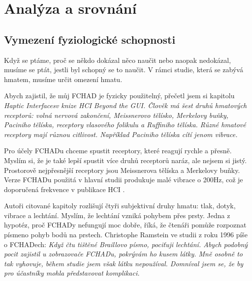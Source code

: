 \chapter{Analýza a srovnání}

\section{Vymezení fyziologické schopnosti}
Když se ptáme, proč se někdo dokázal něco naučit nebo naopak nedokázal, musíme se ptát, jestli byl schopný se to naučit.  V rámci studie, která se zabývá hmatem, musíme určit omezení hmatu.

Abych zajistil, že můj FCHAD je fyzicky použitelný, přečetl jsem si kapitolu \em Haptic Interfaces\em  v knize \em HCI Beyond the GUI\em. Člověk má šest druhů hmatových receptorů: volná nervová zakončení, Meissnerovo tělísko, Merkelovy buňky, Paciniho tělíska, receptory vlasového folikulu a Ruffiniho tělíska. Různé hmatové receptory mají různou citlivost.  Například Paciniho tělíska cítí jenom vibrace.

Pro účely FCHADu chceme spustit receptory, které reagují rychle a přesně.  Myslím si, že je také lepší spustit více druhů receptorů naráz, ale nejsem si jistý.  Prostorově nejpřesnější receptory jsou Meissnerova tělíska a Merkelovy buňky. Verze FCHADu použitá v hlavní studii produkuje malé vibrace o 200Hz, což je doporučená frekvence v publikace HCI \citep[str. 29-30]{nielsen2008gesture}.

Autoři citované kapitoly rozlišují čtyři subjektivní druhy hmatu: tlak, dotyk, vibrace a lechtání.  Myslím, že lechtání vzniká pohybem přes prsty.  Jedna z hypotéz, proč FCHADy nefungují moc dobře, říká, že čtenáři pomůže rozpoznat písmeno pohyb bodů na prstech.  Christophe Ramstein ve studii z roku 1996 píše o FCHADech: \em {} \em  \citep[str. 38, přeloženo z angličtiny]{ramstein1996combining}
Když čtu tištěné Braillovo písmo, pociťuji lechtání.  Abych podobný pocit zajistil u zobrazovače FCHADu, pokrývám ho kusem látky.  Mně osobně to tak vyhovuje, během studie jsem však látku nepoužíval. Domníval jsem se, že by pro účastníky mohla představovat komplikaci.

